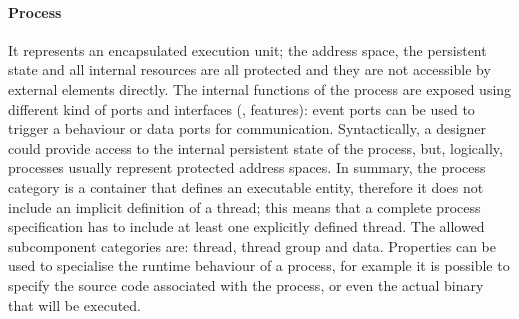 \paragraph{Process} It represents an encapsulated execution unit; the address space, the persistent state and all internal resources are all protected and they are not accessible by external elements directly. The internal functions of the process are exposed using different kind of ports and interfaces (\ie, features): event ports can be used to trigger a behaviour or data ports for communication. Syntactically, a designer could provide access to the internal persistent state of the process, but, logically, processes usually represent protected address spaces. In summary, the process category is a container that defines an executable entity, therefore it does not include an implicit definition of a thread; this means that a complete process specification has to include at least one explicitly defined thread. The allowed subcomponent categories are: thread, thread group and data. Properties can be used to specialise the runtime behaviour of a process, for example it is possible to specify the source code associated with the process, or even the actual binary that will be executed. 

